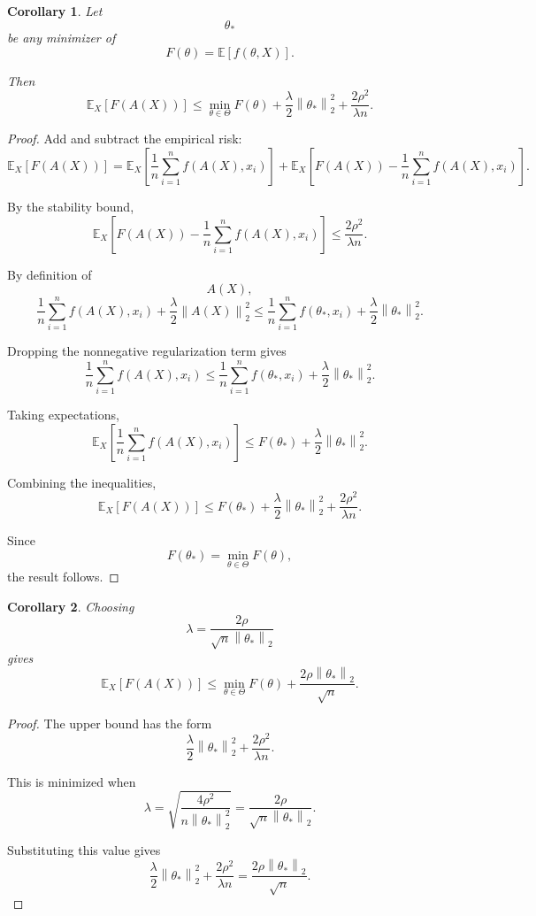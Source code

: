 \documentclass[12pt,oneside]{book}
\numberwithin{equation}{section}
\theoremstyle{definition}
\theoremstyle{plain}
\newtheorem{corollary}{Corollary}[section]
\theoremstyle{remark}
\newcommand{\E}{\mathbb{E}}
\newcommand{\norm}[1]{\left\lVert #1 \right\rVert}
\begin{document}
\begin{corollary}
Let
\[
\theta_*
\]
be any minimizer of
\[
F(\theta)
=
\E[f(\theta,X)].
\]

Then
\[
\E_X[F(A(X))]
\leq
\min_{\theta\in\Theta}F(\theta)
+
\frac{\lambda}{2}\norm{\theta_*}_2^2
+
\frac{2\rho^2}{\lambda n}.
\]
\end{corollary}

\begin{proof}
Add and subtract the empirical risk:
\[
\E_X[F(A(X))]
=
\E_X
\left[
\frac{1}{n}\sum_{i=1}^n f(A(X),x_i)
\right]
+
\E_X
\left[
F(A(X))
-
\frac{1}{n}\sum_{i=1}^n f(A(X),x_i)
\right].
\]

By the stability bound,
\[
\E_X
\left[
F(A(X))
-
\frac{1}{n}\sum_{i=1}^n f(A(X),x_i)
\right]
\leq
\frac{2\rho^2}{\lambda n}.
\]

By definition of
\[
A(X),
\]
\[
\frac{1}{n}\sum_{i=1}^n f(A(X),x_i)
+
\frac{\lambda}{2}\norm{A(X)}_2^2
\leq
\frac{1}{n}\sum_{i=1}^n f(\theta_*,x_i)
+
\frac{\lambda}{2}\norm{\theta_*}_2^2.
\]

Dropping the nonnegative regularization term gives
\[
\frac{1}{n}\sum_{i=1}^n f(A(X),x_i)
\leq
\frac{1}{n}\sum_{i=1}^n f(\theta_*,x_i)
+
\frac{\lambda}{2}\norm{\theta_*}_2^2.
\]

Taking expectations,
\[
\E_X
\left[
\frac{1}{n}\sum_{i=1}^n f(A(X),x_i)
\right]
\leq
F(\theta_*)
+
\frac{\lambda}{2}\norm{\theta_*}_2^2.
\]

Combining the inequalities,
\[
\E_X[F(A(X))]
\leq
F(\theta_*)
+
\frac{\lambda}{2}\norm{\theta_*}_2^2
+
\frac{2\rho^2}{\lambda n}.
\]

Since
\[
F(\theta_*)=\min_{\theta\in\Theta}F(\theta),
\]
the result follows.
\end{proof}

\begin{corollary}
Choosing
\[
\lambda
=
\frac{2\rho}{\sqrt{n}\norm{\theta_*}_2}
\]
gives
\[
\E_X[F(A(X))]
\leq
\min_{\theta\in\Theta}F(\theta)
+
\frac{2\rho\norm{\theta_*}_2}{\sqrt{n}}.
\]
\end{corollary}

\begin{proof}
The upper bound has the form
\[
\frac{\lambda}{2}\norm{\theta_*}_2^2
+
\frac{2\rho^2}{\lambda n}.
\]

This is minimized when
\[
\lambda
=
\sqrt{
\frac{4\rho^2}{n\norm{\theta_*}_2^2}
}
=
\frac{2\rho}{\sqrt{n}\norm{\theta_*}_2}.
\]

Substituting this value gives
\[
\frac{\lambda}{2}\norm{\theta_*}_2^2
+
\frac{2\rho^2}{\lambda n}
=
\frac{2\rho\norm{\theta_*}_2}{\sqrt{n}}.
\]
\end{proof}
\end{document}

